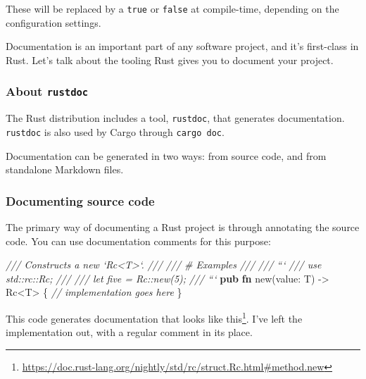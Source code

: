 \documentclass[a4paper,]{book}
\newenvironment{Shaded}{\begin{snugshade}}{\end{snugshade}}
\newcommand{\KeywordTok}[1]{\textcolor[rgb]{0.13,0.29,0.53}{\textbf{{#1}}}}
\newcommand{\CommentTok}[1]{\textcolor[rgb]{0.56,0.35,0.01}{\textit{{#1}}}}
\newcommand{\NormalTok}[1]{{#1}}
\renewcommand{\href}[2]{#2\footnote{\url{#1}}}
\begin{document}
These will be replaced by a \texttt{true} or \texttt{false} at
compile-time, depending on the configuration settings.


Documentation is an important part of any software project, and it's
first-class in Rust. Let's talk about the tooling Rust gives you to
document your project.

\subsubsection{\texorpdfstring{About
\texttt{rustdoc}}{About rustdoc}}\label{about-rustdoc}

The Rust distribution includes a tool, \texttt{rustdoc}, that generates
documentation. \texttt{rustdoc} is also used by Cargo through
\texttt{cargo\ doc}.

Documentation can be generated in two ways: from source code, and from
standalone Markdown files.

\subsubsection{Documenting source code}\label{documenting-source-code}

The primary way of documenting a Rust project is through annotating the
source code. You can use documentation comments for this purpose:

\begin{Shaded}
\begin{Highlighting}[]
\CommentTok{/// Constructs a new `Rc<T>`.}
\CommentTok{///}
\CommentTok{/// # Examples}
\CommentTok{///}
\CommentTok{/// ```}
\CommentTok{/// use std::rc::Rc;}
\CommentTok{///}
\CommentTok{/// let five = Rc::new(5);}
\CommentTok{/// ```}
\KeywordTok{pub} \KeywordTok{fn} \NormalTok{new(value: T) -> Rc<T> \{}
    \CommentTok{// implementation goes here}
\NormalTok{\}}
\end{Highlighting}
\end{Shaded}

This code generates documentation that looks
\href{https://doc.rust-lang.org/nightly/std/rc/struct.Rc.html\#method.new}{like
this}. I've left the implementation out, with a regular comment in its
place.
\end{document}
